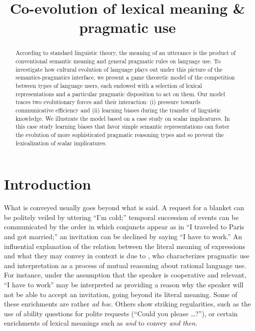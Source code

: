 \documentclass[a4paper, 11pt]{article}
\title{Co-evolution of lexical meaning \& pragmatic use}
\date{}
\theoremstyle{Satz}
\begin{document}

\maketitle

\begin{abstract}
  According to standard linguistic theory, the meaning of an utterance is the product of
  conventional semantic meaning and general pragmatic rules on language use. To investigate how
  cultural evolution of language plays out under this picture of the semantics-pragmatics
  interface, we present a game theoretic model of the competition between types of language
  users, each endowed with a selection of lexical representations and a particular pragmatic
  disposition to act on them. Our model traces two evolutionary forces and their interaction:
  (i) pressure towards communicative efficiency and (ii) learning biases during the transfer of
  linguistic knowledge. We illustrate the model based on a case study on scalar
  implicatures. In this case study learning biases that favor simple semantic representations
  can foster the evolution of more sophisticated pragmatic reasoning types and so prevent the
  lexicalization of scalar implicatures.
\end{abstract}

\section{Introduction}\label{sec:introduction}
What is conveyed usually goes beyond what is said. A request for a blanket can be politely
veiled by uttering ``I'm cold;'' temporal succession of events can be communicated by the order
in which conjuncts appear as in ``I traveled to Paris and got married;'' an invitation can be
declined by saying ``I have to work.'' An influential explanation of the relation between the
literal meaning of expressions and what they may convey in context is due to
\citet{grice:1975}, who characterizes pragmatic use and interpretation as a process of mutual
reasoning about rational language use. For instance, under the assumption that the speaker is
cooperative and relevant, ``I have to work'' may be interpreted as providing a reason why the
speaker will not be able to accept an invitation, going beyond its literal meaning. Some of
these enrichments are rather \emph{ad hoc}. Others show striking regularities, such as the use
of ability questions for polite requests (``Could you please \dots?''), or certain enrichments
of lexical meanings such as \emph{and} to convey \emph{and then}.
\end{document}

